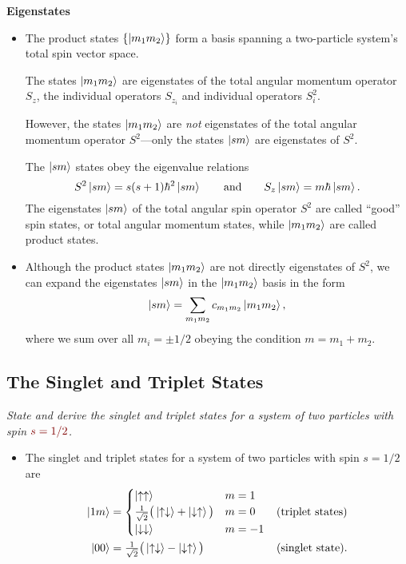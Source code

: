 \documentclass[11pt, a4paper]{article}
\newcommand{\qmath}[1]{\textcolor{Maroon}{#1}}  %
\newcommand{\ua}{\uparrow}  %
\newcommand{\da}{\downarrow}  %
\begin{document}
\textbf{Eigenstates}
\begin{itemize}
    \item The product states $ \{\ket{m_{1}m_{2}}\} $ form a basis spanning a two-particle system's total spin vector space.

    The states $ \ket{m_{1}m_{2}} $ are eigenstates of the total angular momentum operator $ S_{z} $, the individual operators $ S_{z_{i}} $ and individual operators $ S_{i}^{2} $. 

    However, the states $ \ket{m_{1}m_{2}} $ are \textit{not} eigenstates of the total angular momentum operator $ S^{2} $---only the states $ \ket{sm} $ are eigenstates of $ S^{2} $. 

    The $ \ket{sm} $ states obey the eigenvalue relations
    \begin{equation*}
        S^{2}\ket{sm} = s(s+1)\hbar^{2}\ket{sm} \qquad \text{and} \qquad S_{z}\ket{sm} = m\hbar \ket{sm}.
    \end{equation*}
    The eigenstates $ \ket{sm} $ of the total angular spin operator $ S^{2} $ are called ``good'' spin states, or total angular momentum states, while $ \ket{m_{1}m_{2}} $ are called product states.

    \item Although the product states $ \ket{m_{1}m_{2}} $ are not directly eigenstates of $ S^{2} $, we can expand the eigenstates $ \ket{sm} $ in the $ \ket{m_{1}m_{2}} $ basis in the form
    \begin{equation*}
        \ket{sm} = \sum_{m_{1}m_{2}} c_{m_{1}m_{2}}\ket{m_{1}m_{2}},
    \end{equation*}
    where we sum over all $ m_{i} = \pm 1/2 $ obeying the condition $ m = m_{1} + m_{2} $. 
    
\end{itemize}

\subsection{The Singlet and Triplet States}
\textit{State and derive the singlet and triplet states for a system of two particles with spin $ \qmath{s = 1/2} $.}
\begin{itemize}
    \item The singlet and triplet states for a system of two particles with spin $ s = 1/2 $ are
    \begin{align*}
        \ket{1m} &= 
        \begin{cases}
            \ket{\ua\ua} & m = 1\\
            \tfrac{1}{\sqrt{2}} \big( \ket{\ua\da} + \ket{\da\ua} \big) & m = 0\\
            \ket{\da\da} & m = -1
        \end{cases} & \text{(triplet states)}\\
        \ket{00} &= \tfrac{1}{\sqrt{2}} \big( \ket{\ua\da} - \ket{\da \ua} \big) & \text{(singlet state)}.
    \end{align*}

\end{itemize}
\end{document}
